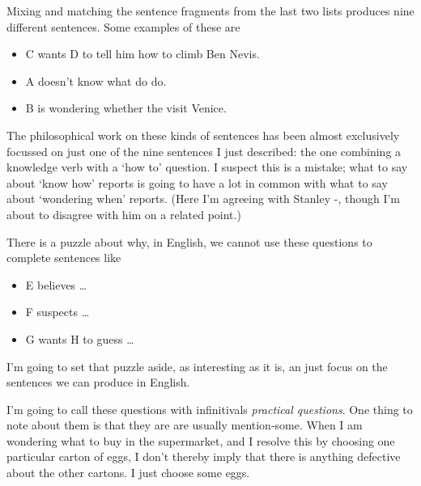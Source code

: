 \documentclass[
  11pt,
]{book}
\providecommand{\tightlist}{%
  \setlength{\itemsep}{0pt}\setlength{\parskip}{0pt}}
\begin{document}
Mixing and matching the sentence fragments from the last two lists produces nine different sentences. Some examples of these are

\begin{itemize}
\tightlist
\item
  C wants D to tell him how to climb Ben Nevis.
\item
  A doesn't know what do do.
\item
  B is wondering whether the visit Venice.
\end{itemize}

The philosophical work on these kinds of sentences has been almost exclusively focussed on just one of the nine sentences I just described: the one combining a knowledge verb with a `how to' question. I suspect this is a mistake; what to say about `know how' reports is going to have a lot in common with what to say about `wondering when' reports. (Here I'm agreeing with Stanley -\citet{Stanley2011}, though I'm about to disagree with him on a related point.)

There is a puzzle about why, in English, we cannot use these questions to complete sentences like

\begin{itemize}
\tightlist
\item
  E believes \ldots{}
\item
  F suspects \ldots{}
\item
  G wants H to guess \ldots{}
\end{itemize}

I'm going to set that puzzle aside, as interesting as it is, an just focus on the sentences we can produce in English.

I'm going to call these questions with infinitivals \emph{practical questions}. One thing to note about them is that they are are usually mention-some. When I am wondering what to buy in the supermarket, and I resolve this by choosing one particular carton of eggs, I don't thereby imply that there is anything defective about the other cartons. I just choose some eggs.
\end{document}

